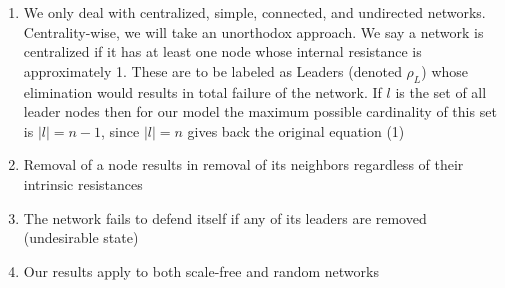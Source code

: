 \documentclass{article}
\begin{document}
	\begin{enumerate}
		\item {We only deal with centralized, simple, connected, and undirected networks.}
		Centrality-wise, we will take an unorthodox approach. We say a network is centralized if it has at least one node whose internal resistance is approximately 1. These are to be labeled as Leaders (denoted $\rho_L$) whose elimination would results in total failure of the network. If $l$ is the set of all leader nodes then for our model the maximum possible cardinality of this set is $|l| = n-1$, since $|l|=n$ gives back the original equation (1)
		\item {Removal of a node results in removal of its neighbors regardless of their intrinsic resistances}
		\item {The network fails to defend itself if any of its leaders are removed (undesirable state)}
		\item {Our results apply to both scale-free and random networks}
	\end{enumerate}
	
\end{document}
